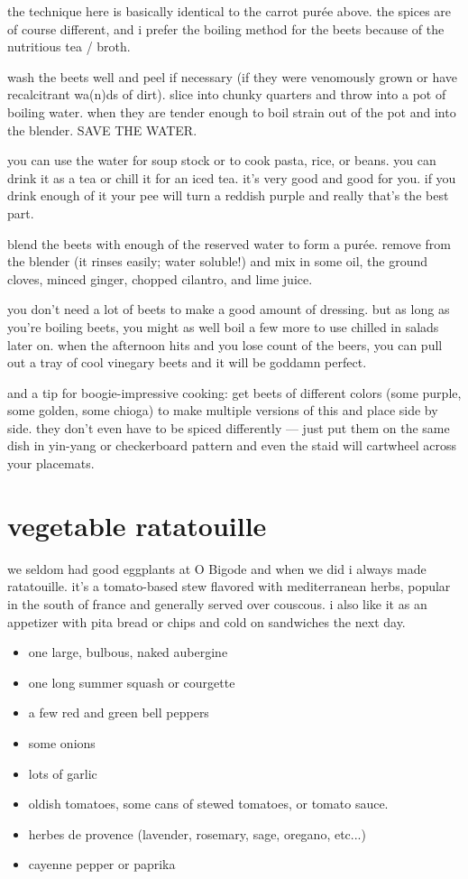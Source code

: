the technique here is basically identical to the carrot pur\'{e}e above. the 
spices are of course different, and i prefer the boiling method for the beets 
because of the nutritious tea / broth.

wash the beets well and peel if necessary (if they were venomously grown or 
have recalcitrant wa(n)ds of dirt). slice into chunky quarters and throw into 
a pot of boiling water. when they are tender enough to boil strain out of the 
pot and into the blender. SAVE THE WATER.

you can use the water for soup stock or to cook pasta, rice, or beans. you can 
drink it as a tea or chill it for an iced tea. it's very good and good for 
you. if you drink enough of it your pee will turn a reddish purple and really 
that's the best part.

blend the beets with enough of the reserved water to form a pur\'{e}e. remove 
from the blender (it rinses easily; water soluble!) and mix in some oil, the 
ground cloves, minced ginger, chopped cilantro, and lime juice.

you don't need a lot of beets to make a good amount of dressing. but as long 
as you're boiling beets, you might as well boil a few more to use chilled in 
salads later on. when the afternoon hits and you lose count of the beers, you 
can pull out a tray of cool vinegary beets and it will be goddamn perfect.

and a tip for boogie-impressive cooking: get beets of different colors (some 
purple, some golden, some chioga) to make multiple versions of this and place 
side by side. they don't even have to be spiced differently --- just put them 
on the same dish in yin-yang or checkerboard pattern and even the staid will 
cartwheel across your placemats.


\section{vegetable ratatouille}

we seldom had good eggplants at O Bigode and when we did i always made 
ratatouille. it's a tomato-based stew flavored with mediterranean herbs, 
popular in the south of france and generally served over couscous. i also 
like it as an appetizer with pita bread or chips and cold on sandwiches the 
next day.

\begin{itemize}
  \item one large, bulbous, naked aubergine
  \item one long summer squash or courgette
  \item a few red and green bell peppers
  \item some onions
  \item lots of garlic
  \item oldish tomatoes, some cans of stewed tomatoes, or tomato sauce.
  \item herbes de provence (lavender, rosemary, sage, oregano, etc...)
  \item cayenne pepper or paprika
\end{itemize}

